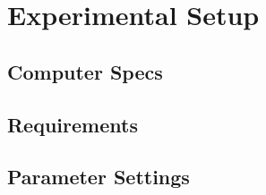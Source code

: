 \section{Experimental Setup}

\subsection{Computer Specs}


\subsection{Requirements}


\subsection{Parameter Settings}

